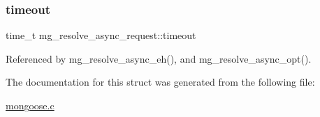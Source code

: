 \subsubsection{\texorpdfstring{timeout}{timeout}}
{\footnotesize\ttfamily time\+\_\+t mg\+\_\+resolve\+\_\+async\+\_\+request\+::timeout}



Referenced by mg\+\_\+resolve\+\_\+async\+\_\+eh(), and mg\+\_\+resolve\+\_\+async\+\_\+opt().



The documentation for this struct was generated from the following file\+:\begin{DoxyCompactItemize}
\item 
\hyperlink{mongoose_8c}{mongoose.\+c}\end{DoxyCompactItemize}
